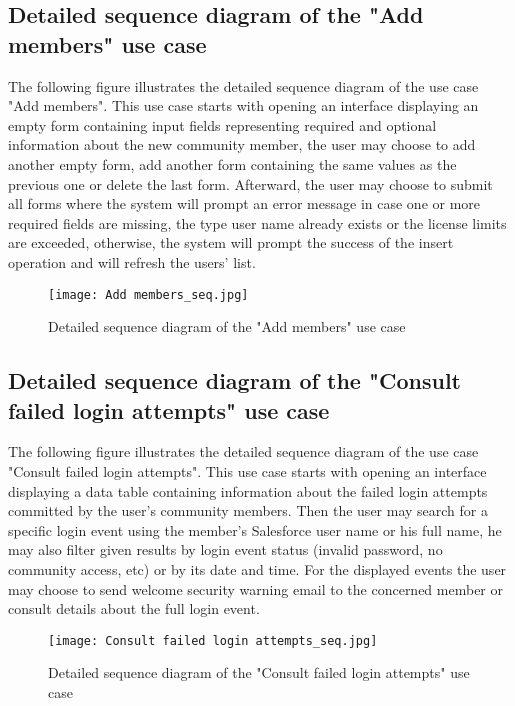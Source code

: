 \subsection{Detailed sequence diagram of the "Add members" use case}
The following figure illustrates the detailed sequence diagram of the use case
"Add members".
This use case starts with opening an interface displaying an empty form containing input fields representing required and optional information about the new community member, the user may choose to add another empty form, add another form containing the same values as the previous one or delete the last form. Afterward, the user may choose to submit all forms where the system will prompt an error message in case one or more required fields are missing, the type user name already exists or the license limits are exceeded, otherwise, the system will prompt the success of the insert operation and will refresh the users' list. 
 \begin{figure}[H]%
    \center   
    \texttt{[image: Add members\_seq.jpg]}
    \caption{Detailed sequence diagram of the "Add members" use case}
\end{figure}

\subsection{Detailed sequence diagram of the "Consult failed login attempts" use case}
The following figure illustrates the detailed sequence diagram of the use case
"Consult failed login attempts".
This use case starts with opening an interface displaying a data table containing information about the failed login attempts committed by the user's community members. Then the user may search for a specific login event using the member's Salesforce user name or his full name, he may also filter given results by login event status (invalid password, no community access, etc) or by its date and time. For the displayed events the user may choose to send welcome security warning email to the concerned member or consult details about the full login event.
\begin{figure}[H]%
    \center   
    \texttt{[image: Consult failed login attempts\_seq.jpg]}
    \caption{Detailed sequence diagram of the "Consult failed login attempts" use case}
\end{figure}
